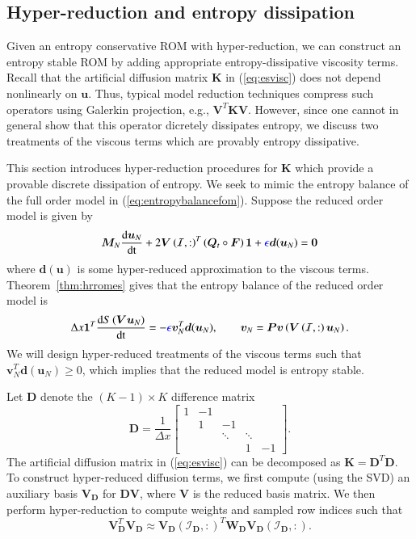 \documentclass[preprint,10pt]{elsarticle}
\theoremstyle{definition}
\theoremstyle{lemma}
\theoremstyle{theorem}
\theoremstyle{assumption}
\newcommand{\td}[2]{\frac{{\rm d}#1}{{\rm d}{\rm #2}}}
\newcommand{\LRp}[1]{\left( #1 \right)}
\newcommand{\note}[1]{{\color{blue}{#1}}}
\newcommand{\bnote}[1]{{\color{blue}{#1}}}
\begin{document}

\subsection{Hyper-reduction and entropy dissipation}
\label{sec:diss}

Given an entropy conservative ROM with hyper-reduction, we can construct an entropy stable ROM by adding appropriate entropy-dissipative viscosity terms.  Recall that the artificial diffusion matrix $\bm{K}$ in (\ref{eq:esvisc}) does not depend nonlinearly on $\bm{u}$.  Thus, typical model reduction techniques compress such operators using Galerkin projection, e.g., $\bm{V}^T\bm{K}\bm{V}$.  However, since one cannot in general show that this operator dicretely dissipates entropy, we discuss two treatments of the viscous terms which are provably entropy dissipative.  

This section introduces hyper-reduction procedures for $\bm{K}$ which provide a provable discrete dissipation of entropy.  We seek to mimic the entropy balance of the full order model in (\ref{eq:entropybalancefom}).  Suppose the reduced order model is given by 
\[
\bm{M}_N\td{\bm{u}_N}{t} + 2\bm{V}\LRp{\mathcal{I},:}^T\LRp{\bm{Q}_t \circ \bm{F}}\bm{1} + \bnote{\epsilon}\bm{d}(\bm{u}_N)= \bm{0}
\]
where $\bm{d}(\bm{u})$ is some hyper-reduced approximation to the viscous terms.  Theorem~\ref{thm:hrromes} gives that the entropy balance of the reduced order model is
\[
\Delta x \bm{1}^T\td{S\LRp{\bm{V}\bm{u}_N}}{t} = -\bnote{\epsilon}\bm{v}_N^T\bm{d}(\bm{u}_N), \qquad \bm{v}_N = \bm{P}\bm{v}\LRp{\bm{V}\LRp{\mathcal{I},:}\bm{u}_N}.
\]
We will design hyper-reduced treatments of the viscous terms such that $\bm{v}_N^T\bm{d}(\bm{u}_N) \geq 0$, which implies that the reduced model is entropy stable.  

Let $\bm{D}$ denote the $(K-1)\times K$ difference matrix
\[
\bm{D} = \frac{1}{\Delta x}\begin{bmatrix}
1 & -1 &&& \\
 & 1 & -1 && \\
 & & \ddots & \ddots&\\
&  & & 1 & -1
\end{bmatrix}.
\]
The artificial diffusion matrix in (\ref{eq:esvisc}) can be decomposed as $\bm{K} = \bm{D}^T\bm{D}$.  To construct hyper-reduced diffusion terms, we first compute (using the SVD) an auxiliary basis $\bm{V}_{\bm{D}}$ for $\bm{D}\bm{V}$, where $\bm{V}$ is the reduced basis matrix.  We then perform hyper-reduction to compute weights and sampled row indices such that 
\[
\bm{V}_{\bm{D}}^T\bm{V}_{\bm{D}} \approx \bm{V}_{\bm{D}}\LRp{\mathcal{I}_{\bm{D}},:}^T \bm{W}_{\bm{D}}\bm{V}_{\bm{D}}\LRp{\mathcal{I}_{\bm{D}},:}.
\]
\end{document}
